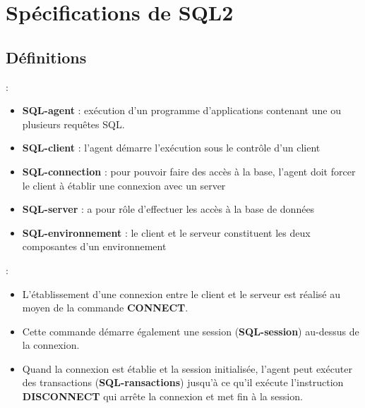 \documentclass[10pt]{beamer}
\begin{document}
\section{Spécifications de SQL2}
\tocss
\subsection{Définitions}
\begin{frame}{\secname : \subsecname}
    \begin{itemize}
        \item \textbf{SQL-agent} : exécution d'un programme d'applications contenant une ou plusieurs requêtes SQL.
        \item \textbf{SQL-client} : l'agent démarre l'exécution sous le contrôle d'un client
        \item \textbf{SQL-connection} : pour pouvoir faire des accès à la base, l'agent doit forcer le client à établir une connexion avec un server
        \item \textbf{SQL-server} : a pour rôle d'effectuer les accès à la base de données
        \item \textbf{SQL-environnement} : le client et le serveur constituent les deux composantes d'un environnement
    \end{itemize}
\end{frame}

\begin{frame}{\secname : \subsecname}
    \begin{itemize}
        \item L'établissement d'une connexion entre le client et le serveur est réalisé au moyen de la commande \textbf{CONNECT}.
        \item Cette commande démarre également une session (\textbf{SQL-session}) au-dessus de la connexion.
        \item Quand la connexion est établie et la session initialisée, l'agent peut exécuter des transactions (\textbf{SQL-ransactions}) jusqu'à ce qu'il exécute l'instruction \textbf{DISCONNECT} qui arrête la connexion et met fin à la session.
    \end{itemize}
\end{frame}
\end{document}
